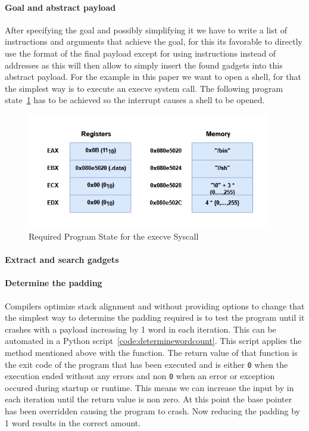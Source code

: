 \documentclass[journal=tosc,submission, notanonymous]{iacrtrans}
\begin{document}
\paragraph{Goal and abstract payload}
After specifying the goal and possibly simplifying it we have to write a list of instructions and arguments that achieve the goal, for this its favorable to directly use the format of the final payload except for using instructions instead of addresses as this will then allow to simply insert the found gadgets into this abstract payload. For the example in this paper we want to open a shell, for that the simplest way is to execute an execve system call. The following program state~\cref{fig:stateforint} has to be achieved so the interrupt  causes a shell to be opened.~\cite{pixis}~\cite{proggen-rop}
\begin{figure}[h]
  \centering
  \includegraphics[width=0.95\textwidth]{requirementstackmemory.png}
  \caption{Required Program State for the execve Syscall}
  \label{fig:stateforint}
\end{figure}
\paragraph{Extract and search gadgets}
\paragraph{Determine the padding}
Compilers optimize stack alignment and without providing options to change that the simplest way to determine the padding required is to test the program until it crashes with a payload increasing by 1 word in each iteration. This can be automated in a Python script~\cref{code:determinewordcount}. This script applies the method mentioned above with the  function. The return value of that function is the exit code of the program that has been executed and is either \Verb+0+ when the execution ended without any errors and non \Verb+0+ when an error or exception occured during startup or runtime. This means we can increase the input by  in each iteration until the return value is non zero. At this point the base pointer  has been overridden causing the program to crash. Now reducing the padding by 1 word results in the correct amount.
\end{document}
